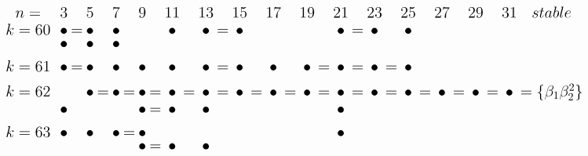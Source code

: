 \documentclass{article}
\begin{document}
\(
\begin{tikzcd}[
nodes={font=\Large,inner sep=0pt},
row sep=0.2cm,
column sep=0.1cm
]
n= && & 3 & & 5 & & 7 & & 9 & & 11 & & 13 & & 15 & & 17 && 19 && 21 && 23 && 25 && 27 && 29 && 31 & stable \\
k=60 &&& \bullet &=& \bullet && \bullet && && \bullet && \bullet &=& \bullet && && && \bullet &=& \bullet && \bullet \\
&&& \bullet && \bullet && \bullet \\ \\
k=61 &&& \bullet &=& \bullet && \bullet && \bullet && \bullet && \bullet &=& \bullet && \bullet && \bullet &=& \bullet &=& \bullet &=& \bullet \\ \\
k=62 &&& && \bullet &=& \bullet &=& \bullet &=& \bullet &=& \bullet &=& \bullet &=& \bullet &=& \bullet &=& \bullet &=& \bullet &=& \bullet &=& \bullet &=& \bullet &=& \bullet & =\{\beta_1\beta_2^2\} \\
&&& \bullet && && && \bullet &=& \bullet && \bullet && && && && \bullet \\ \\
k=63 &&& \bullet && \bullet && \bullet &=& \bullet && && && && && && \bullet \\
&&& && && && \bullet &=& \bullet && \bullet \\
\\
\end{tikzcd}
\)
\end{document}

